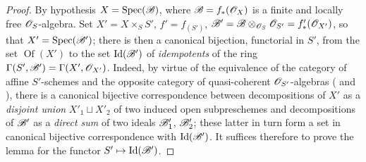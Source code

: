 \begin{proof}
By hypothesis $X=\operatorname{Spec}(\mathscr{B})$, where $\mathscr{B}=f_*(\mathscr{O}_X)$ is a finite and locally free $\mathscr{O}_S$-algebra.
Set $X'=X\times_S S'$, $f'=f_{(S')}$, $\mathscr{B}'=\mathscr{B}\otimes_{\mathscr{O}_S}\mathscr{O}_{S'}=f'_*(\mathscr{O}_{X'})$, so that $X'=\operatorname{Spec}(\mathscr{B}')$;
there is then a canonical bijection, functorial in $S'$, from the set $\operatorname{Of}(X')$ to the set $\operatorname{Id}(\mathscr{B}')$ of \emph{idempotents} of the ring $\Gamma(S',\mathscr{B}')=\Gamma(X',\mathscr{O}_{X'})$.
Indeed, by virtue of the equivalence of the category of affine $S'$-schemes and the opposite category of quasi-coherent $\mathscr{O}_{S'}$-algebras ( and ), there is a canonical bijective correspondence between decompositions of $X'$ as a \emph{disjoint union} $X'_1\sqcup X'_2$ of two induced open subpreschemes and decompositions of $\mathscr{B}'$ as a \emph{direct sum} of two ideals $\mathscr{B}'_1$, $\mathscr{B}'_2$;
these latter in turn form a set in canonical bijective correspondence with $\operatorname{Id}(\mathscr{B}')$.
It suffices therefore to prove the lemma for the functor $S'\mapsto\operatorname{Id}(\mathscr{B}')$.


\end{proof}
